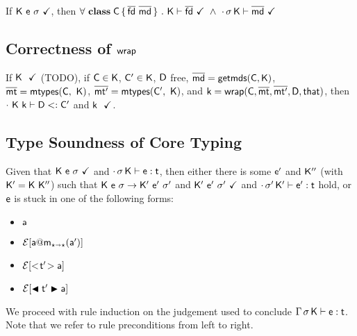 \documentclass[acmlarge, anonymous, authordraft]{acmart}
\begin{document}
If $\WFp\K{\e~\s}$, then $\forall~\Class\C{\b{\fd}}{\b\md}~.~\WFtype\K{\b\fd}~\wedge~\WF\cdot\s\K{\b\md}$

\subsection{Correctness of $\xt{wrap}$}

If $\WFp \K$ (TODO), if $\C \in \K$, $\Cp \in \K$, $\D$ free, $\b\md = \getmds\C\K$, $\bmt = \classoff\C\K$, $\bmtp = \classoff\Cp\K$, and $\k = \wrap\C\bmt\bmtp\D\that$, then $\StrSub\cdot{\K~\k}\D\Cp$ and $\WFp \k$.

\subsection{Type Soundness of Core \kafka Typing}

Given that $\WFp\K{\e~\s}$ and $\EnvType\cdot\s\K\e\t$, then either there is some $\ep$ and $\Kpp$ (with $\Kp = \K~\Kpp$) 
such that $\Reduce \K\e\s \Kp\ep\sp$ and $\WFp\Kp{\ep~\sp}$ and $\EnvType\cdot\sp\Kp\ep\t$ hold, 
or $\e$ is stuck in one of the following forms:
\begin{itemize} 
\item $\a$
\item $\EE[\DynCall\a\m{\ap}]$
\item $\EE[\SubCast\tp\a]$
\item $\EE[\BehCast\tp\a]$
\end{itemize}

We proceed with rule induction on the judgement used to conclude $\EnvType\Env\s\K\e\t$. 
Note that we refer to rule preconditions from left to right.
\end{document}
